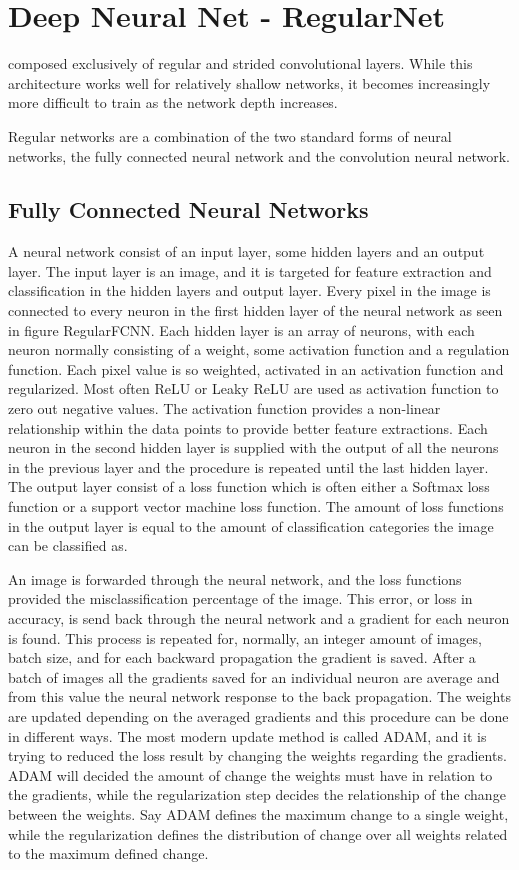 \section{Deep Neural Net - RegularNet}
composed exclusively of regular and strided convolutional layers. While this architecture works well for relatively shallow networks, it becomes increasingly more difficult to train as the network depth increases.

Regular networks are a combination of the two standard forms of neural networks, the fully connected neural network and the convolution neural network.

\subsection{Fully Connected Neural Networks}
A neural network consist of an input layer, some hidden layers and an output layer. The input layer is an image, and it is targeted for feature extraction and classification in the hidden layers and output layer. Every pixel in the image is connected to every neuron in the first hidden layer of the neural network as seen in figure RegularFCNN.    
Each hidden layer is an array of neurons, with each neuron normally consisting of a weight, some activation function and a regulation function. Each pixel value is so weighted, activated in an activation function and regularized. Most often ReLU or Leaky ReLU are used as activation function to zero out negative values. The activation function provides a non-linear relationship within the data points to provide better feature extractions. Each neuron in the second hidden layer is supplied with the output of all the neurons in the previous layer and the procedure is repeated until the last hidden layer. The output layer consist of a loss function which is often either a Softmax loss function or a support vector machine loss function. The amount of loss functions in the output layer is equal to the amount of classification categories the image can be classified as.

An image is forwarded through the neural network, and the loss functions provided the misclassification percentage of the image. This error, or loss in accuracy, is send back through the neural network and a gradient for each neuron is found. This process is repeated for, normally, an integer amount of images, batch size, and for each backward propagation the gradient is saved. After a batch of images all the gradients saved for an individual neuron are average and from this value the neural network response to the back propagation. The weights are updated depending on the averaged gradients and this procedure can be done in different ways. The most modern update method is called ADAM, and it is trying to reduced the loss result by changing the weights regarding the gradients. ADAM will decided the amount of change the weights must have in relation to the gradients, while the regularization step decides the relationship of the change between the weights. Say ADAM defines the maximum change to a single weight, while the regularization defines the distribution of change over all weights related to the maximum defined change.

